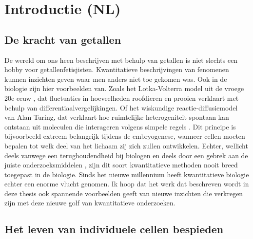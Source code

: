 

\chapter*{Introductie (NL)}




\section*{De kracht van getallen}

De wereld om ons heen beschrijven met behulp van getallen is niet slechts een hobby voor getallenfetisjisten.
Kwantitatieve beschrijvingen van fenomenen kunnen inzichten geven waar men anders niet toe gekomen was.
%
Ook in de biologie zijn hier voorbeelden van.
%
Zoals het Lotka-Volterra model uit de vroege 20e eeuw \cite{Lotka1920,Volterra1928}, dat fluctuaties in hoeveelheden roofdieren en prooien verklaart met behulp van differentiaalvergelijkingen.
%
Of het wiskundige reactie-diffusiemodel van Alan Turing,
dat verklaart hoe ruimtelijke heterogeniteit spontaan kan ontstaan uit moleculen die 
interageren volgens simpele regels \cite{Turing1952}.
%
Dit principe is bijvoorbeeld extreem belangrijk tijdens de embryogenese, wanneer cellen moeten bepalen tot welk deel van het lichaam zij zich zullen ontwikkelen.
%
Echter,
wellicht deels vanwege een terughoudendheid bij biologen  \cite{Lazebnik2003} en deels door een gebrek aan de juiste onderzoeksmiddelen \cite{Kitano2002, Wollman2018}, 
zijn dit soort kwantitatieve methoden nooit breed toegepast in de biologie.
%
Sinds het nieuwe millennium heeft kwantitatieve biologie echter 
een enorme vlucht genomen. 
%
Ik hoop dat het werk dat beschreven wordt in deze thesis ook spannende voorbeelden geeft van nieuwe inzichten die verkregen zijn met deze nieuwe golf van kwantitatieve onderzoeken.




\section*{Het leven van individuele cellen bespieden}

